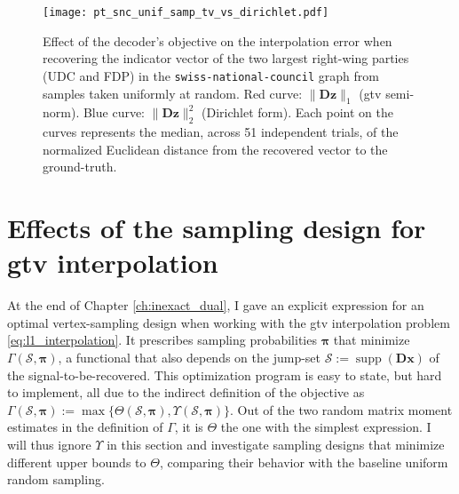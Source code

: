 \begin{figure}[H]
    \centering
    \texttt{[image: pt\_snc\_unif\_samp\_tv\_vs\_dirichlet.pdf]}
    \caption[Decoder's objective and the interpolation error: \texttt{swiss-national-council}]{Effect of the decoder's objective on the interpolation error when recovering the indicator vector of the two largest right-wing parties (UDC and FDP) in the \texttt{swiss-national-council} graph from samples taken uniformly at random. \textcolor{epfl-groseille}{Red} curve: $\|\mathbf{Dz}\|_1$ (\acrlong{gtv} semi-norm). \textcolor{epfl-canard}{Blue} curve: $\|\mathbf{Dz}\|_2^2$ (Dirichlet form). Each point on the curves represents the median, across 51 independent trials, of the normalized Euclidean distance from the recovered vector to the ground-truth.}
    \label{fig:pt_snc_unif_samp_tv_vs_dirichlet}
\end{figure}


\section{Effects of the sampling design for \texorpdfstring{\acrshort{gtv}}{G-TV} interpolation}

At the end of Chapter \ref{ch:inexact_dual}, I gave an explicit expression for an optimal vertex-sampling design when working with the \acrshort{gtv} interpolation problem \eqref{eq:l1_interpolation}. It prescribes sampling probabilities $\bm{\pi}$ that minimize $\Gamma(\mathcal{S}, \bm{\pi})$, a functional that also depends on the jump-set $\mathcal{S} := \operatorname{supp}\left ( \mathbf{Dx} \right )$ of the signal-to-be-recovered. This optimization program is easy to state, but hard to implement, all due to the indirect definition of the objective as $\Gamma (\mathcal{S}, \bm{\pi}) := \max \{ \Theta (\mathcal{S}, \bm{\pi}), \Upsilon (\mathcal{S}, \bm{\pi})\}$. Out of the two random matrix moment estimates in the definition of $\Gamma$, it is $\Theta$ the one with the simplest expression. I will thus ignore $\Upsilon$ in this section and investigate sampling designs that minimize different upper bounds to $\Theta$, comparing their behavior with the baseline uniform random sampling.

